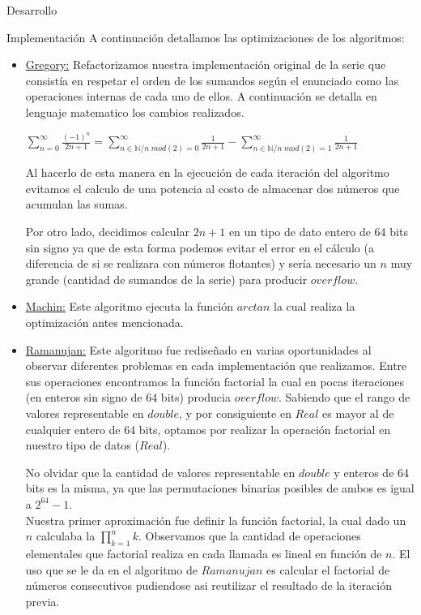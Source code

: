 \begin{section}{Desarrollo}
\begin{subsection}{Implementación}
	   A continuación detallamos las optimizaciones de los algoritmos:

		\begin{itemize}
			\item \underline{Gregory:} Refactorizamos nuestra implementación original de la serie que consistía en respetar el orden de los sumandos según el enunciado como las operaciones internas de cada uno de ellos. A continuación se detalla en lenguaje matematico los cambios realizados.
							
				$\sum_{n=0}^{\infty}\frac{(-1)^n}{2n+1} = \sum_{n \in \mathbb{N} / n\;mod(2)=0}^{\infty}\frac{1}{2n+1}-\sum_{n \in \mathbb{N} / n\;mod(2)=1}^{\infty}\frac{1}{2n+1}$
				
				Al hacerlo de esta manera en la ejecución de cada iteración del algoritmo evitamos el calculo de una potencia al costo de almacenar dos números que acumulan las sumas.
				
				Por otro lado, decidimos calcular $2n+1$ en un tipo de dato entero de 64 bits sin signo ya que de esta forma podemos evitar el error en el cálculo (a diferencia de si se realizara con números flotantes) y sería necesario un $n$ muy grande (cantidad de sumandos de la serie) para producir $overflow$.
				
			\item \underline{Machin:} Este algoritmo ejecuta la función $arctan$ la cual realiza la optimización antes mencionada.
			
			\item \underline{Ramanujan:} Este algoritmo fue rediseñado en varias oportunidades al observar diferentes problemas en cada implementación que realizamos. Entre sus operaciones encontramos la función factorial la cual en pocas iteraciones (en enteros sin signo de 64 bits) producia $overflow$. Sabiendo que el rango de valores representable en $double$, y por consiguiente en $Real$ es mayor al de cualquier entero de 64 bits, optamos por realizar la operación factorial en nuestro tipo de datos ($Real$).
			
		No olvidar que la cantidad de valores representable en $double$ y enteros de 64 bits es la misma, ya que las permutaciones binarias posibles de ambos es igual a $2^{64}-1$.\\
		
		Nuestra primer aproximación fue definir la función factorial, la cual dado un $n$ calculaba la $\prod_{k=1}^{n}{k}$. Observamos que la cantidad de operaciones elementales que factorial realiza en cada llamada es lineal en función de $n$. El uso que se le da en el algoritmo de $Ramanujan$ es calcular el factorial de números consecutivos pudiendose asi reutilizar el resultado de la iteración previa.\VSP
		

\end{itemize}
\end{subsection}
\end{section}
